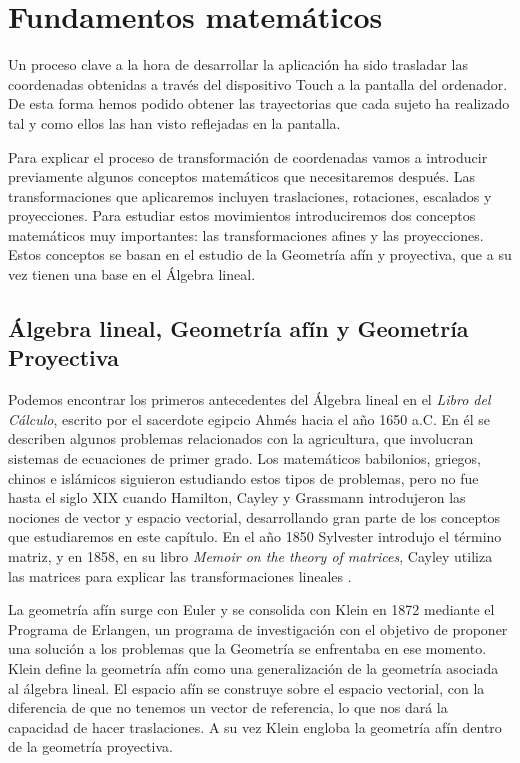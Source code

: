 \documentclass[a4paper,11pt, oneside]{book}
\begin{document}
\chapter{Fundamentos matemáticos}

Un proceso clave a la hora de desarrollar la aplicación ha sido trasladar las coordenadas obtenidas a través del dispositivo Touch a la pantalla del ordenador. De esta forma hemos podido obtener las trayectorias que cada sujeto ha realizado tal y como ellos las han visto reflejadas en la pantalla. 

Para explicar el proceso de transformación de coordenadas vamos a introducir previamente algunos conceptos matemáticos que necesitaremos después. Las transformaciones que aplicaremos incluyen traslaciones, rotaciones, escalados y proyecciones. Para estudiar estos movimientos introduciremos dos conceptos matemáticos muy importantes: las transformaciones afines y las proyecciones. Estos conceptos se basan en el estudio de la Geometría afín y proyectiva, que a su vez tienen una base en el Álgebra lineal. 


\section{Álgebra lineal, Geometría afín y Geometría Proyectiva}
Podemos encontrar los primeros antecedentes del Álgebra lineal en el \textit{Libro del Cálculo}, escrito por el sacerdote egipcio Ahmés hacia el año 1650 a.C. En él se describen algunos problemas relacionados con la agricultura, que involucran sistemas de ecuaciones de primer grado. Los matemáticos babilonios, griegos, chinos e islámicos siguieron estudiando estos tipos de problemas, pero no fue hasta el siglo  XIX cuando Hamilton, Cayley y Grassmann introdujeron las nociones de vector y espacio vectorial, desarrollando gran parte de los conceptos que estudiaremos en este capítulo. En el año 1850 Sylvester introdujo el término matriz, y en 1858, en su libro \textit{Memoir on the theory of matrices}, Cayley utiliza las matrices para explicar las transformaciones lineales \cite{historia}.

La geometría afín surge con Euler y se consolida con Klein en 1872 mediante el Programa de Erlangen, un programa de investigación con el objetivo de proponer una solución a los problemas que la Geometría se enfrentaba en ese momento. Klein define la geometría afín como una generalización de la geometría asociada al álgebra lineal. El espacio afín se construye sobre el espacio vectorial, con la diferencia de que no tenemos un vector de referencia, lo que nos dará la capacidad de hacer traslaciones. A su vez Klein engloba la geometría afín dentro de la geometría proyectiva.
\end{document}
